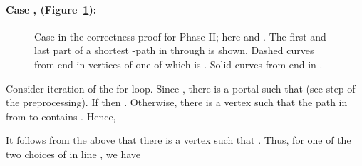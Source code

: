 \documentclass[11pt]{article}
\begin{document}
\paragraph{Case ,  (Figure~\ref{fig:Case2}):}
\begin{figure}\centerline{}
\caption{Case  in the correctness proof for Phase II; here  and . The first and last part of a shortest -path in  through  is shown. Dashed curves from  end in vertices of  one of which is . Solid curves from  end in .}
\label{fig:Case2}
\end{figure}
Consider iteration  of the for-loop. Since , there is a portal  such that  (see step  of the preprocessing). If  then . Otherwise, there is a vertex  such that the path in  from  to  contains . Hence,


It follows from the above that there is a vertex  such that . Thus, for one of the two choices of  in line , we have
\end{document}
